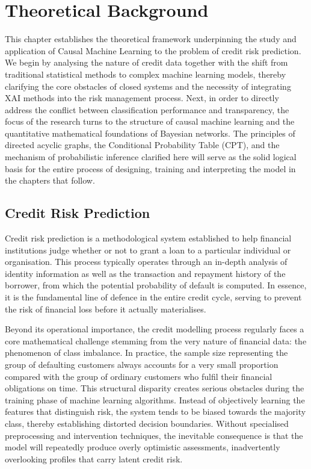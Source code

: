 \newpage
\section{Theoretical Background}
\noindent
This chapter establishes the theoretical framework underpinning the study and application of Causal Machine Learning to the problem of credit risk prediction. We begin by analysing the nature of credit data together with the shift from traditional statistical methods to complex machine learning models, thereby clarifying the core obstacles of closed systems and the necessity of integrating XAI methods into the risk management process. Next, in order to directly address the conflict between classification performance and transparency, the focus of the research turns to the structure of causal machine learning and the quantitative mathematical foundations of Bayesian networks. The principles of directed acyclic graphs, the Conditional Probability Table (CPT), and the mechanism of probabilistic inference clarified here will serve as the solid logical basis for the entire process of designing, training and interpreting the model in the chapters that follow.

\subsection{Credit Risk Prediction}
\noindent
Credit risk prediction is a methodological system established to help financial institutions judge whether or not to grant a loan to a particular individual or organisation. This process typically operates through an in-depth analysis of identity information as well as the transaction and repayment history of the borrower, from which the potential probability of default is computed. In essence, it is the fundamental line of defence in the entire credit cycle, serving to prevent the risk of financial loss before it actually materialises.

Beyond its operational importance, the credit modelling process regularly faces a core mathematical challenge stemming from the very nature of financial data: the phenomenon of class imbalance. In practice, the sample size representing the group of defaulting customers always accounts for a very small proportion compared with the group of ordinary customers who fulfil their financial obligations on time. This structural disparity creates serious obstacles during the training phase of machine learning algorithms. Instead of objectively learning the features that distinguish risk, the system tends to be biased towards the majority class, thereby establishing distorted decision boundaries. Without specialised preprocessing and intervention techniques, the inevitable consequence is that the model will repeatedly produce overly optimistic assessments, inadvertently overlooking profiles that carry latent credit risk.

